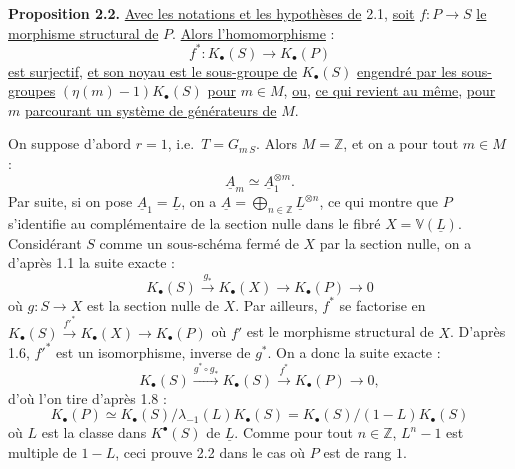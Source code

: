 
\textbf{Proposition 2.2.} \uline{Avec les notations et les hypothèses de} 2.1, \uline{soit} $f:P\to S$ \uline{le morphisme structural de} $P$. \uline{Alors l'homomorphisme} :
\[
f^*:K_\bullet(S)\longrightarrow K_\bullet(P)
\]
\uline{est surjectif}, \uline{et son noyau est le sous-groupe de} $K_\bullet(S)$ \uline{engendré par les sous-groupes} $(\eta(m)-1)K_\bullet(S)$ \uline{pour} $m\in M$, \uline{ou}, \uline{ce qui revient au même}, \uline{pour} $m$ \uline{parcourant un système de générateurs de} $M$.

On suppose d'abord $r=1$, i.e.\ $T=G_{m\,S}$. Alors $M=\mathbb Z$, et on a pour tout $m\in M$ :
\[
\underline{A}_m\simeq \underline{A}_1^{\otimes m}.
\]
Par suite, si on pose $\underline{A}_1=\underline{L}$, on a $\underline{A}=\bigoplus_{n\in\mathbb Z}\underline{L}^{\otimes n}$, ce qui montre que $P$ s'identifie au complémentaire de la section nulle dans le fibré $X=\mathbb V(\underline{L})$. Considérant $S$ comme un sous-schéma fermé de $X$ par la section nulle, on a d'après 1.1 la suite exacte :
\[
K_\bullet(S)\xrightarrow{g_*}K_\bullet(X)\longrightarrow K_\bullet(P)\longrightarrow 0
\]
où $g:S\to X$ est la section nulle de $X$. Par ailleurs, $f^*$ se factorise en \(K_\bullet(S)\xrightarrow{f'^*}K_\bullet(X)\longrightarrow K_\bullet(P)\) où $f'$ est le morphisme structural de $X$. D'après 1.6, $f'^*$ est un isomorphisme, inverse de $g^*$. On a donc la suite exacte :
\[
K_\bullet(S)\xrightarrow{g^*\circ g_*}K_\bullet(S)\xrightarrow{f^*}K_\bullet(P)\longrightarrow 0,
\]
d'où l'on tire d'après 1.8 :
\[
K_\bullet(P)\simeq K_\bullet(S)/\lambda_{-1}(L)K_\bullet(S)=K_\bullet(S)/(1-L)K_\bullet(S)
\]
où $L$ est la classe dans $K^{\bullet}(S)$ de $\underline{L}$. Comme pour tout $n\in\mathbb Z$, $L^n-1$ est multiple de $1-L$, ceci prouve 2.2 dans le cas où $P$ est de rang $1$.

